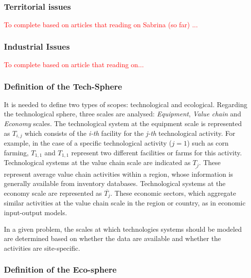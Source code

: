 \documentclass[
  14pt,
]{extarticle}
\begin{document}
\hypertarget{territorial-issues}{%
\subsubsection{Territorial issues}\label{territorial-issues}}

\textcolor{red}{ To complete based on articles that reading on Sabrina (so far) ...}

\hypertarget{industrial-issues}{%
\subsubsection{Industrial Issues}\label{industrial-issues}}

\textcolor{red}{ To complete based on article that reading on...}

\hypertarget{definition-of-the-tech-sphere}{%
\subsubsection{Definition of the Tech-Sphere}\label{definition-of-the-tech-sphere}}

It is needed to define two types of scopes: technological and ecological.
Regarding the technological sphere, three scales are analysed: \emph{Equipment}, \emph{Value chain} and \emph{Economy} scales.
The technological system at the equipment scale is represented as \(T_{i,j}\) which consists of the \emph{i-th} facility for the \emph{j-th} technological activity.
For example, in the case of a specific technological activity (\(j = 1\)) such as corn farming, \(T_{1,1}\) and \(T_{1,1}\) represent two different facilities or farms for this activity.
Technological systems at the value chain scale are indicated as \(\underline{T_{j}}\).
These represent average value chain activities within a region, whose information is generally available from inventory databases.
Technological systems at the economy scale are represented as \(\overline{T_{j}}\).
These economic sectors, which aggregate similar activities at the value chain scale in the region or country, as in economic input-output models.

In a given problem, the scales at which technologies systems should be modeled are determined based on whether the data are available and whether the activities are site-specific.

\hypertarget{definition-of-the-eco-sphere}{%
\subsubsection{Definition of the Eco-sphere}\label{definition-of-the-eco-sphere}}
\end{document}
